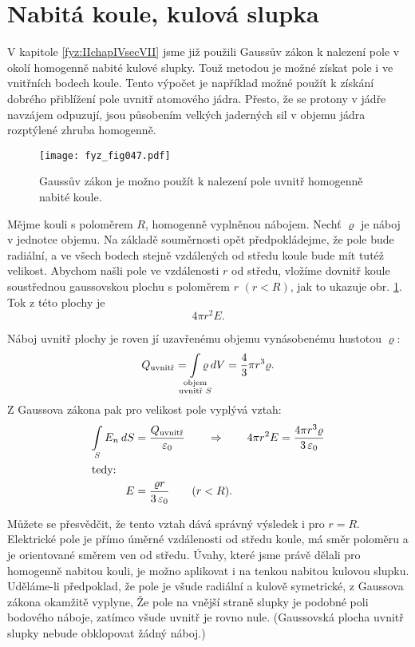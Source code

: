 \section{Nabitá koule, kulová slupka}\label{fyz:IIchapVsecVI}
  V kapitole \ref{fyz:IIchapIVsecVII} jsme již použili Gaussův zákon k nalezení pole v okolí 
  homogenně nabité kulové slupky. Touž metodou je možné získat pole i ve vnitřních bodech 
  koule. Tento výpočet je například možné použít k získání dobrého přiblížení pole uvnitř 
  atomového jádra. Přesto, že se protony v jádře navzájem odpuzují, jsou působením velkých 
  jaderných sil v objemu jádra rozptýlené zhruba homogenně.

  \begin{figure}[ht!]  %
    \centering
    \texttt{[image: fyz\_fig047.pdf]}
    \caption{Gaussův zákon je možno použít k nalezení pole uvnitř homogenně nabité koule.}
    \label{fyz:fig047}
  \end{figure}
  Mějme kouli s poloměrem \(R\), homogenně vyplněnou nábojem. Nechť \(\varrho\) je náboj v 
  jednotce objemu. Na základě souměrnosti opět předpokládejme, že pole bude radiální, a ve 
  všech bodech stejně vzdálených od středu koule bude mít tutéž velikost. Abychom našli pole ve 
  vzdálenosti \(r\) od středu, vložíme dovnitř koule soustřednou gaussovskou plochu s poloměrem 
  \(r\) \((r< R)\), jak to ukazuje obr. \ref{fyz:fig047}. Tok z této plochy je 
  \[4\pi r^2E.\]

  Náboj uvnitř plochy je roven jí uzavřenému objemu vynásobenému hustotou \(\varrho\):
  \begin{equation}\label{fyz:eq_fey_elstat_gauss05} 
    Q_{\text{uvnitř}} 
            = \limitint_{\mathclap{\substack{\text{objem}\\
                                             \text{uvnitř }S}}} \varrho\dd{V} 
            = \frac{4}{3}\pi r^3\varrho.           
  \end{equation}
  Z Gaussova zákona pak pro velikost pole vyplývá vztah:
  \begin{align}      
   \mathop{\int}_S E_n\hspace{2pt}dS
      &= \frac{Q_{\text{uvnitř}}}{\varepsilon_0} 
            \qquad\Rightarrow\qquad 4\pi r^2E 
            = \frac{4\pi r^3\varrho}{3\,\varepsilon_0}  \label{fyz:eq_fey_elstat_gauss06} \\ 
   \shortintertext{tedy:}
   E  &= \frac{\varrho r}{3\,\varepsilon_0} \qquad (r<R).
  \end{align}
  
  Můžete se přesvědčit, že tento vztah dává správný výsledek i pro \(r=R\). Elektrické pole je 
  přímo úměrné vzdálenosti od středu koule, má směr poloměru a je orientované směrem ven od 
  středu. Úvahy, které jsme právě dělali pro homogenně nabitou kouli, je možno aplikovat i na 
  tenkou nabitou kulovou slupku. Uděláme-li předpoklad, že pole je všude radiální a kulově 
  symetrické, z Gaussova zákona okamžitě vyplyne, Že pole na vnější straně slupky je podobné 
  poli bodového náboje, zatímco všude uvnitř je rovno nule. (Gaussovská plocha uvnitř slupky 
  nebude obklopovat žádný náboj.)
  
